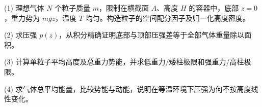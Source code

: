 (1) 理想气体 \(N\) 个粒子质量 \(m\)，限制在横截面 \(A\)、高度 \(H\) 的容器中，底部 \(z=0\)，重力势为 \(mgz\)，温度 \(T\) 均匀。构造粒子的空间配分因子及归一化高度密度。

(2) 求压强 \(p(z)\)，从积分精确证明底部与顶部压强差等于全部气体重量除以面积。

(3) 计算单粒子平均高度及总重力势能，并求低重力/矮柱极限和强重力/高柱极限。

(4) 求气体总平均能量，比较势能与动能，说明在等温环境下压强为何不按高度线性变化。
